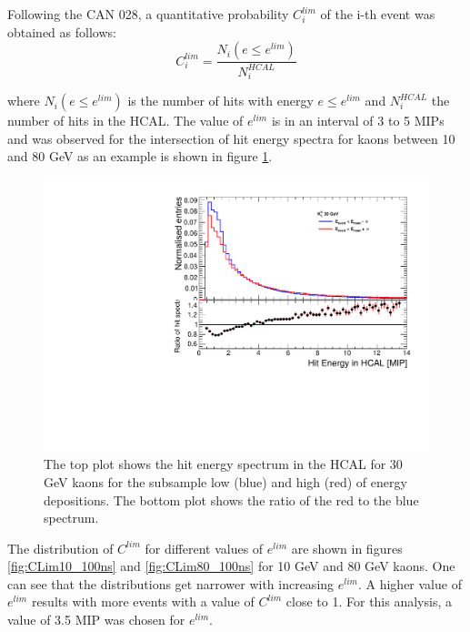 Following the CAN 028, a quantitative probability $C_{i}^{lim}$ of the i-th event was obtained as follows:
\begin{equation}
  C_{i}^{lim} = \frac{N_{i}(e \leq e^{lim})}{N_{i}^{HCAL}}
\end{equation}

where $N_{i}(e \leq e^{lim})$ is the number of hits with energy $e \leq e^{lim}$ and $N_{i}^{HCAL}$ the number of hits in the HCAL. The value of $e^{lim}$ is in an interval of 3 to 5 MIPs and was observed for the intersection of hit energy spectra for kaons between 10 and 80 GeV as an example is shown in figure \ref{fig:HitSpectra30_Zoom_100ns}.

\begin{figure}[htbp!]
  \centering
  \includegraphics[width=0.7\linewidth]{../Thesis_Plots/ILD/AdditionalPlots/Plots/HitEnergySpectra_Zoom_100ns_30GeV.pdf}
  \caption{The top plot shows the hit energy spectrum in the HCAL for 30 GeV kaons for the subsample low (blue) and high (red) of energy depositions. The bottom plot shows the ratio of the red to the blue spectrum.} \label{fig:HitSpectra30_Zoom_100ns}
\end{figure}

The distribution of $C^{lim}$ for different values of $e^{lim}$ are shown in figures \ref{fig:CLim10_100ns} and \ref{fig:CLim80_100ns} for 10 GeV and 80 GeV kaons. One can see that the distributions get narrower with increasing $e^{lim}$. A higher value of $e^{lim}$ results with more events with a value of $C^{lim}$ close to 1. For this analysis, a value of 3.5 MIP was chosen for $e^{lim}$.

